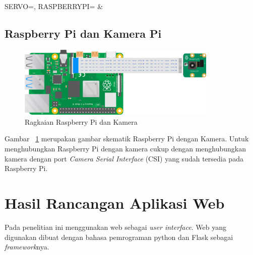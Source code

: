 \begin{atable}
    \caption{Rangkaian pin Servo ke Raspberry Pi}
    \label{table:tableServo}
        {
            SERVO=\SERVO, 
            RASPBERRYPI=\RASPBERRYPI}
        {
            \SERVO & 
            \RASPBERRYPI}
\end{atable}

\subsection{Raspberry Pi dan Kamera Pi}
\begin{figure} [H]
    \includegraphics[width=0.85\textwidth, center]{images/skematik-kamera.png}
    \caption{Ragkaian Raspberry Pi dan Kamera}
    \label{fig:skematikKamera}
\end{figure}

Gambar ~\ref{fig:skematikKamera} merupakan gambar skematik Raspberry Pi dengan Kamera. Untuk menghubungkan Raspberry Pi dengan kamera cukup dengan menghubungkan kamera dengan port \textit{Camera Serial Interface} (CSI) yang sudah tersedia pada Raspberry Pi.


\section{Hasil Rancangan Aplikasi Web}
Pada penelitian ini menggunakan web sebagai \textit{user interface}. Web yang digunakan dibuat dengan bahasa pemrograman python dan Flask sebagai \textit{framework}nya.

